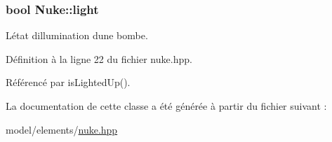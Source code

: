 \subsubsection[{light}]{\setlength{\rightskip}{0pt plus 5cm}bool Nuke\+::light\hspace{0.3cm}{\ttfamily [private]}}\label{classNuke_a397479ffd9a1d1786a46c2a284b8234a}


L\textquotesingle{}état d\textquotesingle{}illumination d\textquotesingle{}une bombe. 



Définition à la ligne 22 du fichier nuke.\+hpp.



Référencé par is\+Lighted\+Up().



La documentation de cette classe a été générée à partir du fichier suivant \+:\begin{DoxyCompactItemize}
\item 
model/elements/\hyperlink{nuke_8hpp}{nuke.\+hpp}\end{DoxyCompactItemize}
